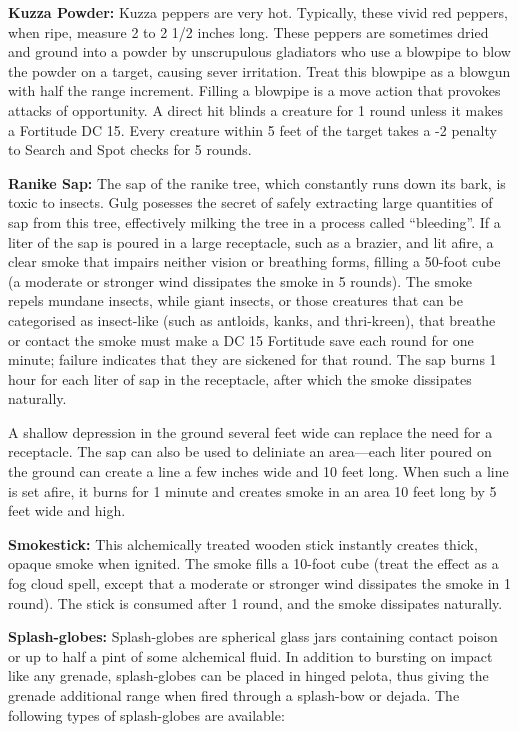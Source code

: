 \textbf{Kuzza Powder:} Kuzza peppers are very hot. Typically, these vivid red peppers, when ripe, measure 2 to 2 1/2 inches long. These peppers are sometimes dried and ground into a powder by unscrupulous gladiators who use a blowpipe to blow the powder on a target, causing sever irritation. Treat this blowpipe as a blowgun with half the range increment. Filling a blowpipe is a move action that provokes attacks of opportunity. A direct hit blinds a creature for 1 round unless it makes a Fortitude DC 15. Every creature within 5 feet of the target takes a -2 penalty to Search and Spot checks for 5 rounds.

\textbf{Ranike Sap:} The sap of the ranike tree, which constantly runs down its bark, is toxic to insects. Gulg posesses the secret of safely extracting large quantities of sap from this tree, effectively milking the tree in a process called “bleeding”. If a liter of the sap is poured in a large receptacle, such as a brazier, and lit afire, a clear smoke that impairs neither vision or breathing forms, filling a 50-foot cube (a moderate or stronger wind dissipates the smoke in 5 rounds). The smoke repels mundane insects, while giant insects, or those creatures that can be categorised as insect-like (such as antloids, kanks, and thri-kreen), that breathe or contact the smoke must make a DC 15 Fortitude save each round for one minute; failure indicates that they are sickened for that round. The sap burns 1 hour for each liter of sap in the receptacle, after which the smoke dissipates naturally.

A shallow depression in the ground several feet wide can replace the need for a receptacle. The sap can also be used to deliniate an area---each liter poured on the ground can create a line a few inches wide and 10 feet long. When such a line is set afire, it burns for 1 minute and creates smoke in an area 10 feet long by 5 feet wide and high.

\textbf{Smokestick:} This alchemically treated wooden stick instantly creates thick, opaque smoke when ignited. The smoke fills a 10-foot cube (treat the effect as a fog cloud spell, except that a moderate or stronger wind dissipates the smoke in 1 round). The stick is consumed after 1 round, and the smoke dissipates naturally.

\textbf{Splash-globes:} Splash-globes are spherical glass jars containing contact poison or up to half a pint of some alchemical fluid. In addition to bursting on impact like any grenade, splash-globes can be placed in hinged pelota, thus giving the grenade additional range when fired through a splash-bow or dejada. The following types of splash-globes are available:

